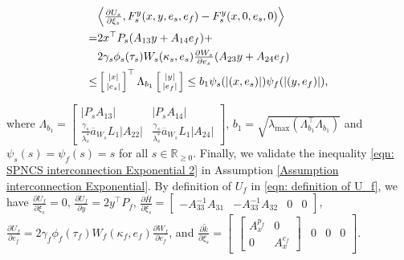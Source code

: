 \begin{small}
\begin{equation}
\setlength\abovedisplayskip{-4pt}%
    \begin{aligned}
        &\Big < \tfrac{\partial {U_s}}{\partial \xi_s}, F_s^y(x,y,e_s,e_f) - F_s^y(x,0,e_s,0)  \Big>
        \\ 
        = & 2 x^\top P_s (A_{13}y + A_{14}e_f) + 
            \\
            & 2 \gamma_s \phi_s(\tau_s)W_s(\kappa_s,e_s) \tfrac{\partial W_s}{\partial e_s}(A_{23} y + A_{24}e_f)
        \\
        \leq & \left[ \begin{smallmatrix}
        |x| \\ |e_s|
    \end{smallmatrix} \right]^\top
    \Lambda_{b_1}
    \left[ \begin{smallmatrix}
        |y| \\ |e_f|
    \end{smallmatrix} \right]
    \leq  b_1 \psi_s(|(x,e_s)|) \psi_f(|(y,e_f)|),
    \end{aligned}
    \label{eqn: Lambda_b1}
\end{equation}
\end{small}
where 
$\Lambda_{b_1} = \left[\begin{smallmatrix}
    |P_s A_{13}| & |P_s A_{14}| \\ \tfrac{\gamma_s}{\lambda_s^*}\overline{a}_{W_s} L_1 |A_{22}| & \tfrac{\gamma_s}{\lambda_s^*}\overline{a}_{W_s} L_1 |A_{24}|
\end{smallmatrix}\right]$, $b_1 = \sqrt{\lambda_{\text{max}}(\Lambda_{b_1}^\top \Lambda_{b_1})}$ and $\psi_s(s) = \psi_f(s) = s$ for all $s \in \mathbb{R}_{\geq 0}$.
%
Finally, we validate the inequality \eqref{eqn: SPNCS interconnection Exponential 2} in Assumption \ref{Assumption interconnection Exponential}. By definition of $U_f$ in \eqref{eqn: definition of U_f}, we have 
$\tfrac{\partial U_f}{\partial \xi_s} = 0$,
%
$\tfrac{\partial U_f}{\partial y} = 2 y^\top P_f$, 
%
$\tfrac{\partial \overline{H}}{\partial \xi_s} = \left[ \begin{smallmatrix}
            -A_{33}^{-1} A_{31} & -A_{33}^{-1} A_{32} & 0 &0
\end{smallmatrix} \right] $,
%
$\tfrac{\partial U_f}{\partial e_f} = 2 \gamma_f \phi_f(\tau_f)W_f(\kappa_f, e_f) \tfrac{\partial W_f}{\partial e_f}$,
and
$\tfrac{\partial \tilde{k}}{\partial \xi_s} = \left[ \begin{smallmatrix}
            \left[\begin{smallmatrix}
                A_x^{p_f} & 0 \\ 0 & A_x^{c_f}
            \end{smallmatrix}\right] & 0 & 0 & 0\end{smallmatrix} \right]$.
